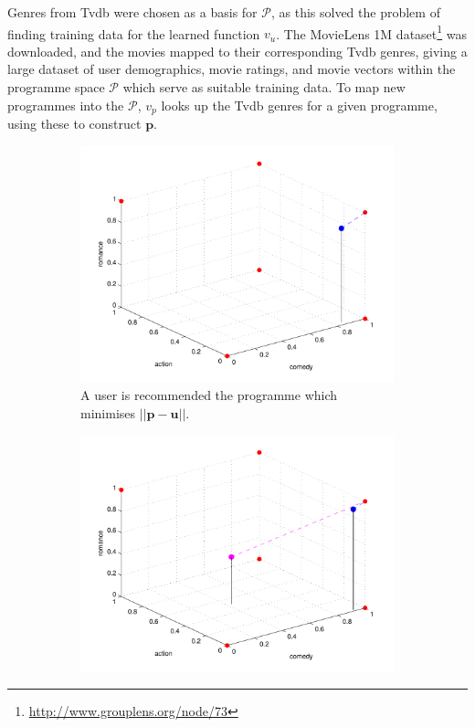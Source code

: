 		Genres from Tvdb were chosen as a basis for $\mathcal{P}$, as this solved the problem of finding training data for the learned function $v_u$. The MovieLens 1M dataset\footnote{\url{http://www.grouplens.org/node/73}} was downloaded, and the movies mapped to their corresponding Tvdb genres, giving a large dataset of user demographics, movie ratings, and movie vectors within the programme space $\mathcal{P}$ which serve as suitable training data. To map new programmes into the $\mathcal{P}$, $v_p$ looks up the Tvdb genres for a given programme, using these to construct $\mathbf{p}$.

			\begin{figure}[h!]
				\begin{center}
				\begin{subfigure}[t]{0.32\textwidth}
					\includegraphics[width=\textwidth]{images/recommender_1.pdf}
					\caption{A user is recommended the programme which minimises $||\mathbf{p} - \mathbf{u}||$.}
				\end{subfigure}
				\begin{subfigure}[t]{0.32\textwidth}
					\includegraphics[width=\textwidth]{images/recommender_2.pdf}

\end{subfigure}
\end{center}
\end{figure}
